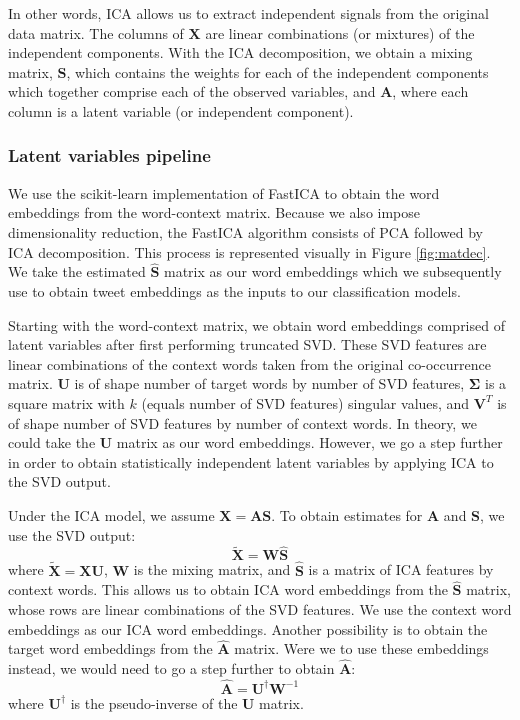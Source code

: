 \documentclass{article}
\begin{document}
In other words, ICA allows us to extract independent signals from the
original data matrix. The columns of \(\mathbf{X}\) are linear
combinations (or mixtures) of the independent components. With the ICA
decomposition, we obtain a mixing matrix, \(\mathbf{S}\), which contains
the weights for each of the independent components which together
comprise each of the observed variables, and \(\mathbf{A}\), where each
column is a latent variable (or independent component).

\hypertarget{latent-variables-pipeline}{%
\subsubsection{Latent variables
pipeline}\label{latent-variables-pipeline}}

\label{sec:LVpipe} We use the scikit-learn implementation of FastICA to
obtain the word embeddings from the word-context matrix. Because we also
impose dimensionality reduction, the FastICA algorithm consists of PCA
followed by ICA decomposition. This process is represented visually in
Figure \ref{fig:matdec}. We take the estimated \(\mathbf{\hat{S}}\)
matrix as our word embeddings which we subsequently use to obtain tweet
embeddings as the inputs to our classification models.

Starting with the word-context matrix, we obtain word embeddings
comprised of latent variables after first performing truncated SVD.
These SVD features are linear combinations of the context words taken
from the original co-occurrence matrix. \(\mathbf{U}\) is of shape
number of target words by number of SVD features, \(\mathbf{\Sigma}\) is
a square matrix with \(k\) (equals number of SVD features) singular
values, and \(\mathbf{V}^T\) is of shape number of SVD features by
number of context words. In theory, we could take the \(\mathbf{U}\)
matrix as our word embeddings. However, we go a step further in order to
obtain statistically independent latent variables by applying ICA to the
SVD output.

Under the ICA model, we assume \(\mathbf{X} = \mathbf{A} \mathbf{S}\).
To obtain estimates for \(\mathbf{A}\) and \(\mathbf{S}\), we use the
SVD output: \[\mathbf{\tilde{X}} = \mathbf{W} \mathbf{\hat{S}}\] where
\(\mathbf{\tilde{X}} = \mathbf{X} \mathbf{U}\), \(\mathbf{W}\) is the
mixing matrix, and \(\mathbf{\hat{S}}\) is a matrix of ICA features by
context words. This allows us to obtain ICA word embeddings from the
\(\mathbf{\hat{S}}\) matrix, whose rows are linear combinations of the
SVD features. We use the context word embeddings as our ICA word
embeddings. Another possibility is to obtain the target word embeddings
from the \(\mathbf{\hat{A}}\) matrix. Were we to use these embeddings
instead, we would need to go a step further to obtain
\(\mathbf{\hat{A}}\):
\[\mathbf{\hat{A}} = \mathbf{U}^{\dagger} \mathbf{W}^{-1}\] where
\(\mathbf{U}^{\dagger}\) is the pseudo-inverse of the \(\mathbf{U}\)
matrix.
\end{document}
